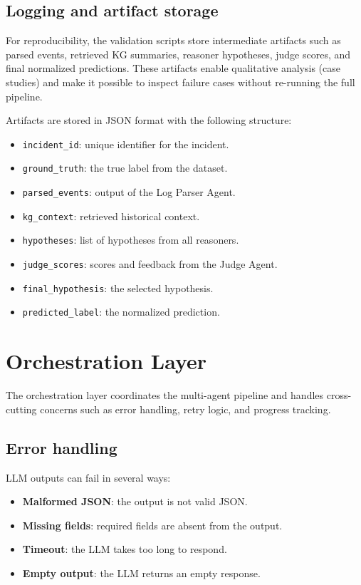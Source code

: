\subsection{Logging and artifact storage}
For reproducibility, the validation scripts store intermediate artifacts such as parsed events,
retrieved KG summaries, reasoner hypotheses, judge scores, and final normalized predictions. These
artifacts enable qualitative analysis (case studies) and make it possible to inspect failure cases
without re-running the full pipeline.

Artifacts are stored in JSON format with the following structure:
\begin{itemize}
  \item \texttt{incident\_id}: unique identifier for the incident.
  \item \texttt{ground\_truth}: the true label from the dataset.
  \item \texttt{parsed\_events}: output of the Log Parser Agent.
  \item \texttt{kg\_context}: retrieved historical context.
  \item \texttt{hypotheses}: list of hypotheses from all reasoners.
  \item \texttt{judge\_scores}: scores and feedback from the Judge Agent.
  \item \texttt{final\_hypothesis}: the selected hypothesis.
  \item \texttt{predicted\_label}: the normalized prediction.
\end{itemize}

\section{Orchestration Layer}
The orchestration layer coordinates the multi-agent pipeline and handles cross-cutting concerns
such as error handling, retry logic, and progress tracking.

\subsection{Error handling}
LLM outputs can fail in several ways:
\begin{itemize}
  \item \textbf{Malformed JSON}: the output is not valid JSON.
  \item \textbf{Missing fields}: required fields are absent from the output.
  \item \textbf{Timeout}: the LLM takes too long to respond.
  \item \textbf{Empty output}: the LLM returns an empty response.
\end{itemize}


